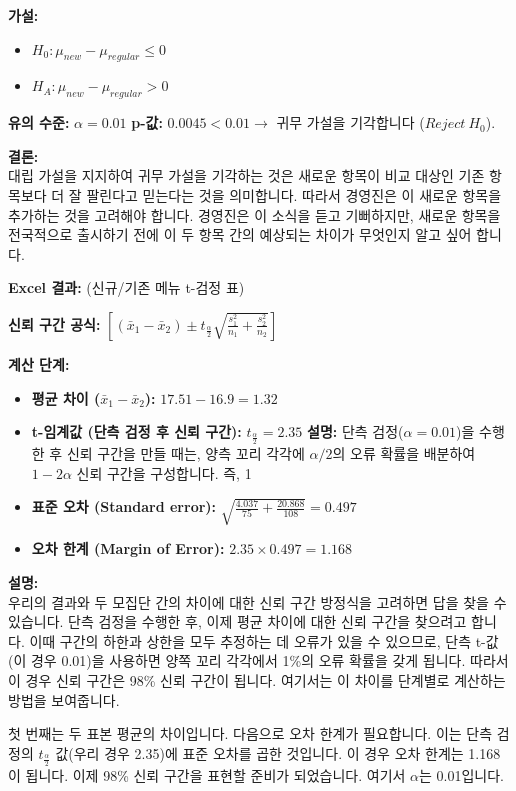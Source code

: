 \documentclass[11pt,a4paper]{article}
\begin{document}
\begin{tcolorbox}[mybox, title=제품 테스트 (5/5): 최종 결론 및 경영진의 관심]
\textbf{가설:}
\begin{itemize}
    \item $H_0 : \mu_{new} - \mu_{regular} \le 0$
    \item $H_A : \mu_{new} - \mu_{regular} > 0$
\end{itemize}
\textbf{유의 수준:} $\alpha = 0.01$
\textbf{p-값:} $0.0045 < 0.01 \rightarrow$ 귀무 가설을 기각합니다 ($Reject \ H_0$).

\textbf{결론:} \\
대립 가설을 지지하여 귀무 가설을 기각하는 것은 새로운 항목이 비교 대상인 기존 항목보다 더 잘 팔린다고 믿는다는 것을 의미합니다.
따라서 경영진은 이 새로운 항목을 추가하는 것을 고려해야 합니다. 경영진은 이 소식을 듣고 기뻐하지만, 새로운 항목을 전국적으로 출시하기 전에 이 두 항목 간의 예상되는 차이가 무엇인지 알고 싶어 합니다.
\end{tcolorbox}

\begin{tcolorbox}[mybox, title=수요의 차이는 얼마나 될까? (1/2) - 신뢰 구간 계산 (단측 검정 후)]
\textbf{Excel 결과:} (신규/기존 메뉴 t-검정 표)

\textbf{신뢰 구간 공식:}
$\left[(\bar{x}_1 - \bar{x}_2) \pm t_{\frac{\alpha}{2}} \sqrt{\frac{s_1^2}{n_1} + \frac{s_2^2}{n_2}}\right]$

\textbf{계산 단계:}
\begin{itemize}
    \item \textbf{평균 차이 ($\bar{x}_1 - \bar{x}_2$):} $17.51 - 16.9 = 1.32$
    \item \textbf{t-임계값 (단측 검정 후 신뢰 구간):} $t_{\frac{\alpha}{2}} = 2.35$
    \textbf{설명:} 단측 검정($\alpha=0.01$)을 수행한 후 신뢰 구간을 만들 때는, 양측 꼬리 각각에 $\alpha/2$의 오류 확률을 배분하여 $1-2\alpha$ 신뢰 구간을 구성합니다. 즉, 1%
    \item \textbf{표준 오차 (Standard error):} $\sqrt{\frac{4.037}{75} + \frac{20.868}{108}} = 0.497$
    \item \textbf{오차 한계 (Margin of Error):} $2.35 \times 0.497 = 1.168$
\end{itemize}

\textbf{설명:} \\
우리의 결과와 두 모집단 간의 차이에 대한 신뢰 구간 방정식을 고려하면 답을 찾을 수 있습니다. 단측 검정을 수행한 후, 이제 평균 차이에 대한 신뢰 구간을 찾으려고 합니다. 이때 구간의 하한과 상한을 모두 추정하는 데 오류가 있을 수 있으므로, 단측 t-값(이 경우 0.01)을 사용하면 양쪽 꼬리 각각에서 1\%의 오류 확률을 갖게 됩니다. 따라서 이 경우 신뢰 구간은 98\% 신뢰 구간이 됩니다. 여기서는 이 차이를 단계별로 계산하는 방법을 보여줍니다.

첫 번째는 두 표본 평균의 차이입니다. 다음으로 오차 한계가 필요합니다. 이는 단측 검정의 $t_{\frac{\alpha}{2}}$ 값(우리 경우 2.35)에 표준 오차를 곱한 것입니다. 이 경우 오차 한계는 1.168이 됩니다. 이제 98\% 신뢰 구간을 표현할 준비가 되었습니다. 여기서 $\alpha$는 0.01입니다.
\end{tcolorbox}
\end{document}
